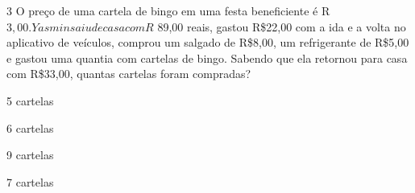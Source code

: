 

\num{3} O preço de uma cartela de bingo em uma festa beneficiente é
R\(3,00. Yasmin saiu de casa com R\) 89,00 reais, gastou R\$22,00 com a
ida e a volta no aplicativo de veículos, comprou um salgado de R\$8,00,
um refrigerante de R\$5,00 e gastou uma quantia com cartelas de bingo.
Sabendo que ela retornou para casa com R\$33,00, quantas cartelas foram
compradas?

\begin{multicols}{2}
\begin{escolha}[itemsep=0pt]
\item 5 cartelas
\item 6 cartelas
\item 9 cartelas
\item 7 cartelas
\end{escolha}
\end{multicols}




